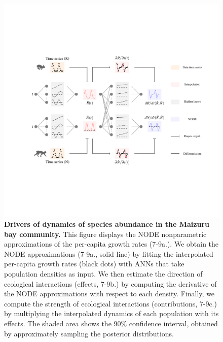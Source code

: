 \documentclass[11pt, oneside]{article}
\begin{document}
\begin{figure}[H]
\includegraphics[width=1\linewidth,page=37]{figures/main.pdf}
\caption{
    \textbf{Drivers of dynamics of species abundance in the Maizuru bay community.}
    This figure displays the NODE nonparametric approximations of the per-capita growth rates (7-9a.). 
    We obtain the NODE approximations (7-9a., solid line) by fitting the interpolated per-capita growth rates (black dots) with ANNs that take population densities as input. 
    We then estimate the direction of ecological interactions (effects, 7-9b.) by computing the derivative of the NODE approximations with respect to each density. 
    Finally, we compute the strength of ecological interactions (contributions, 7-9c.) by multiplying the interpolated dynamics of each population with its effects. 
    The shaded area shows the 90\% confidence interval, obtained by approximately sampling the posterior distributions.
}
\end{figure}
\newpage
\end{document}
